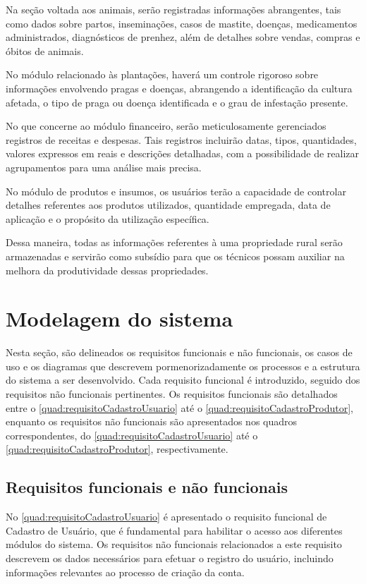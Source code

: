 Na seção voltada aos animais, serão registradas informações abrangentes, tais como dados sobre partos, inseminações, casos de mastite, doenças, medicamentos administrados, diagnósticos de prenhez, além de detalhes sobre vendas, compras e óbitos de animais.

No módulo relacionado às plantações, haverá um controle rigoroso sobre informações envolvendo pragas e doenças, abrangendo a identificação da cultura afetada, o tipo de praga ou doença identificada e o grau de infestação presente.

No que concerne ao módulo financeiro, serão meticulosamente gerenciados registros de receitas e despesas. Tais registros incluirão datas, tipos, quantidades, valores expressos em reais e descrições detalhadas, com a possibilidade de realizar agrupamentos para uma análise mais precisa.

No módulo de produtos e insumos, os usuários terão a capacidade de controlar detalhes referentes aos produtos utilizados, quantidade empregada, data de aplicação e o propósito da utilização específica.

Dessa maneira, todas as informações referentes à uma propriedade rural serão armazenadas e servirão como subsídio para que os técnicos possam auxiliar na melhora da produtividade dessas propriedades.


\section{Modelagem do sistema}\label{sec:modelagemSistema}

Nesta seção, são delineados os requisitos funcionais e não funcionais, os casos de uso e os diagramas que descrevem pormenorizadamente os processos e a estrutura do sistema a ser desenvolvido. Cada requisito funcional é introduzido, seguido dos requisitos não funcionais pertinentes.
Os requisitos funcionais são detalhados entre o \autoref{quad:requisitoCadastroUsuario} até o \autoref{quad:requisitoCadastroProdutor}, enquanto os requisitos não funcionais são apresentados nos quadros correspondentes, do \autoref{quad:requisitoCadastroUsuario} até o \autoref{quad:requisitoCadastroProdutor}, respectivamente.

\subsection{Requisitos funcionais e não funcionais}\label{subsec:requisitosFuncionaisNaoFuncionais}

No \autoref{quad:requisitoCadastroUsuario} é apresentado o requisito funcional de Cadastro de Usuário, que é fundamental para habilitar o acesso aos diferentes módulos do sistema. Os requisitos não funcionais relacionados a este requisito descrevem os dados necessários para efetuar o registro do usuário, incluindo informações relevantes ao processo de criação da conta.

